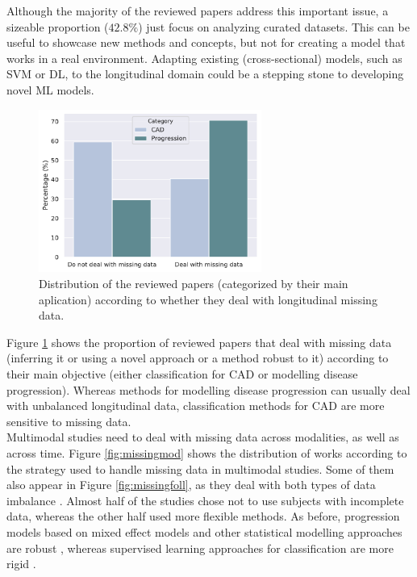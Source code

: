 Although the majority of the reviewed papers address this important issue, a sizeable proportion ($42.8 \%$) just focus on analyzing curated datasets. This can be useful to showcase new methods and concepts, but not for creating a model that works in a real environment. Adapting existing (cross-sectional) models, such as SVM or DL, to the longitudinal domain \cite{Adhikari2019,Ghazi2019,Jie2017,Zhu2016a} could be a stepping stone to developing novel ML models. \\

\begin{figure}[!htbp]
\centering
\includegraphics[width=0.65\textwidth]{figures/review/Fig8.pdf}
    \caption[Distribution of the reviewed papers according to whether they deal with longitudinal missing data.]{Distribution of the reviewed papers (categorized by their main aplication) according to whether they deal with longitudinal missing data.}
    \label{fig:missingcat}
\end{figure}

Figure \ref{fig:missingcat} shows the proportion of reviewed papers that deal with missing data (inferring it or using a novel approach or a method robust to it) according to their main objective (either classification for CAD or modelling disease progression). Whereas methods for modelling disease progression can usually deal with unbalanced longitudinal data, classification methods for CAD are more sensitive to missing data.  \\

Multimodal studies need to deal with missing data across modalities, as well as across time. Figure \ref{fig:missingmod} shows the distribution of works according to the strategy used to handle missing data in multimodal studies. Some of them also appear in Figure \ref{fig:missingfoll}, as they deal with both types of data imbalance \cite{Adhikari2019,Goyal2018,Iturria-Medina2016,Jedynak2012}. Almost half of the studies chose not to use subjects with incomplete data, whereas the other half used more flexible methods. As before, progression models based on mixed effect models and other statistical modelling approaches are robust \cite{Iturria-Medina2016,Jedynak2012,Schmidt-Richberg2015,Villemagne2013}, whereas supervised learning approaches for classification are more rigid \cite{Vounou2012,Young2014,Zhang2012a}. \\


